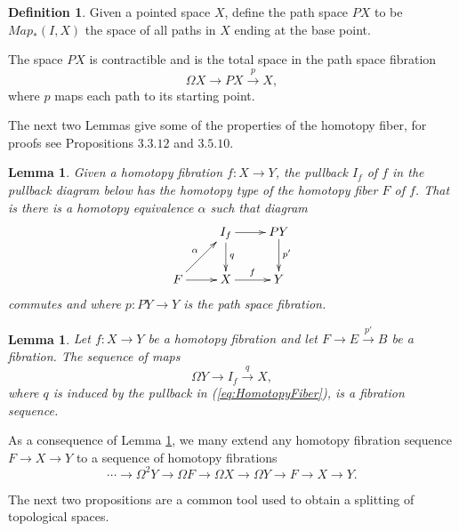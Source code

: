 \documentclass{article}
\theoremstyle{plain}
\newtheorem{lem}[thm]{Lemma}
\theoremstyle{definition}
\newtheorem{defn}[thm]{Definition}
\numberwithin{thm}{section}
\begin{document}
		\begin{defn}
			Given a pointed space $X$, define the path space $PX$ to be $Map_*(I,X)$ the space of all paths  in $X$ ending at the base point.
		\end{defn}
		
		The space $PX$ is contractible and is the total space in the path space fibration
		\begin{equation}\label{eq:PathFibe}
			\Omega X \to PX \xrightarrow{p} X,
		\end{equation}
		where $p$ maps each path to its starting point. 
		
		The next two Lemmas give some of the properties of the homotopy fiber, for proofs see \cite[\S 3]{Arkowitz} Propositions $3.3.12$ and $3.5.10$.
		
		\begin{lem}
			Given a homotopy fibration $f\colon X\to Y$, the pullback $I_f$ of $f$ in the pullback diagram below
			has the homotopy type of the homotopy fiber $F$ of $f$.
			That is there is a homotopy equivalence $\alpha$ such that diagram 
			\begin{equation}\label{eq:HomotopyFiber}
						\xymatrix{
						{} 																			& {I_f} \ar[r]^{} \ar[d]^(.5){q}  & {PY} \ar[d]^(.45){p'} \\
							{F} \ar[r] \ar[ru]^(.5){\alpha} & {X} 	 \ar[r]^(.5){f}  					& {Y} }
			\end{equation}
			commutes and where $p\colon PY \to Y$ is the path space fibration. 
		\end{lem}
		
		\begin{lem}\label{lem:If}
			Let $f\colon X \to Y$ be a homotopy fibration and let $F\to E \xrightarrow{p'} B$ be a fibration.
			The sequence of maps
			\begin{equation*}
				\Omega Y \to I_f \xrightarrow{q} X,
			\end{equation*}
			where $q$ is induced by the pullback in (\ref{eq:HomotopyFiber}), is a fibration sequence. 
		\end{lem}
		
		As a consequence of Lemma \ref{lem:If}, we many extend any homotopy fibration sequence $F\to X \to Y$ to a sequence of homotopy fibrations
		\begin{equation*}
			\cdots \to \Omega^2Y \to \Omega F \to \Omega X \to \Omega Y\to F\to X \to Y.
		\end{equation*}
		
		The next two propositions are a common tool used to obtain a splitting of topological spaces.
		
\end{document}
